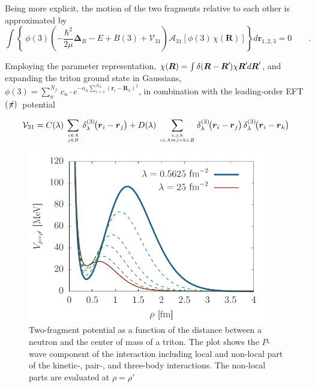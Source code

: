 \documentclass[aps,onecolumn,preprintnumbers,amsmath,amssymb,nofootinbib,superscriptaddress,notitlepage]{revtex4-1}
\newcommand{\eftnopi}{\mbox{EFT$(\not \! \pi)$}}
\newcommand{\ve}[1]{\ensuremath{\boldsymbol{#1}}}
\newcommand*{\mprime}{^{\prime}\mkern-1.2mu}
\newcommand{\ddrei}[1]{\delta_{\tiny \lambda}^{(3)}\!\big(#1\big)}
\newcommand{\cc}{\ensuremath C(\lambda)}
\newcommand{\dd}{\ensuremath D(\lambda)}
\begin{document}
Being more explicit, the motion of the two fragments relative to each other is approximated by
\begin{equation}\label{eq.rgm.eqom}
\int\left\lbrace~\phi(3)\left(-\frac{\hbar^2}{2\mu}\ve{\Delta}_R-E+B(3)+\mathcal{V}_{31}\right)
\mathcal{A}_{31}\left[\phi(3)\,\chi(\ve{R})\right]\right\rbrace d\ve{r}_{1,2,3}=0
\qquad.
\end{equation}

Employing the parameter representation, $\chi(\ve{R})=\int\delta(\ve{R}-\ve{R}\mprime)\chi{\ve{R}\mprime}d\ve{R}\mprime$,
and expanding the triton ground state in Gaussians,
$\phi(3)=\sum_n^{N_f}\,c_n\cdot e^{-\alpha_n\sum_{i=1}^{N_A}\left(\ve{r}_i-\ve{R}_3\right)^2}$,
in combination with the leading-order \eftnopi~potential

\begin{equation}\label{eq.app.pot}
\mathcal{V}_{31}=\cc\,\sum_{i\in A\atop j\in B}\,\ddrei{\ve{r}_i-\ve{r}_j}+
\dd\,\sum_{i,j,k\atop i\in A\Rightarrow j\vee k\in B}\ddrei{\ve{r}_i-\ve{r}_j}\,\ddrei{\ve{r}_i-\ve{r}_k}
\end{equation}

\begin{figure}
\centering
\includegraphics[width=0.95\textwidth]{./Graphs/rgm_potential} 
\caption{Two-fragment potential as a function of the distance between a
neutron and the center of mass of a triton. The plot shows the $P$-wave component of the
interaction including local and non-local part of the kinetic-, pair-, and three-body interactions.
The non-local parts are evaluated at $\rho=\rho'$}
\label{fig:rgm_potential}
\end{figure}
\end{document}
